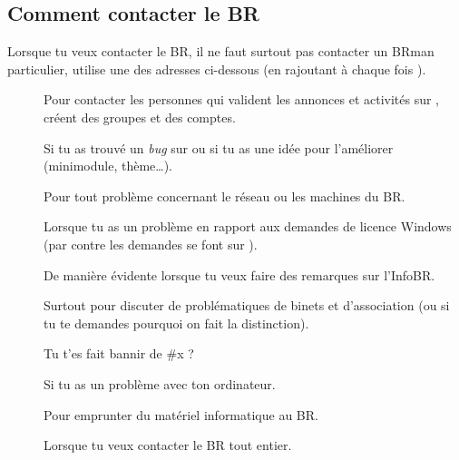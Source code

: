 \subsection{Comment contacter le BR}

Lorsque tu veux contacter le BR, il ne faut surtout pas contacter un BRman particulier, utilise une des adresses ci-dessous (en rajoutant \`a chaque fois ).

\begin{description}

\item[] Pour contacter les personnes qui valident les annonces et activit\'es sur \fkz, cr\'eent des groupes et des comptes.

\item[] Si tu as trouv\'e un \emph{bug} sur \fkz ou si tu as une id\'ee pour l'am\'eliorer (minimodule, th\`eme\dots).

\item[] Pour tout probl\`eme concernant le r\'eseau ou les machines du BR.

\item[] Lorsque tu as un probl\`eme en rapport aux demandes de licence Windows (par contre les demandes se font sur \fkz).

\item[] De mani\`ere \'evidente lorsque tu veux faire des remarques sur l'InfoBR.

\item[] Surtout pour discuter de probl\'ematiques de binets et d'association (ou si tu te demandes pourquoi on fait la distinction). 

\item[] Tu t'es fait bannir de \#x ?

\item[] Si tu as un probl\`eme avec ton ordinateur.

\item[] Pour emprunter du mat\'eriel informatique au BR.

\item[] Lorsque tu veux contacter le BR tout entier.

\end{description}
